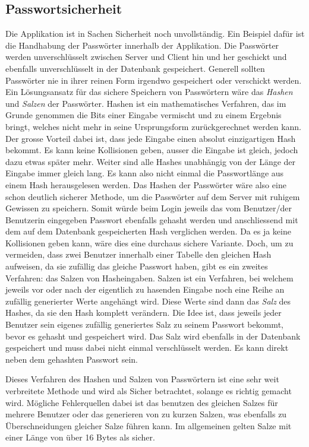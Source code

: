 \documentclass[a4paper,11pt]{report}
\begin{document}
		\subsection{Passwortsicherheit}
		Die Applikation ist in Sachen Sicherheit noch unvollständig. Ein Beispiel dafür ist die Handhabung der Passwörter innerhalb der Applikation. Die Passwörter werden unverschlüsselt zwischen Server und Client hin und her geschickt und ebenfalls unverschlüsselt in der Datenbank gespeichert. Generell sollten Passwörter nie in ihrer reinen Form irgendwo gespeichert oder verschickt werden. Ein Lösungsansatz für das sichere Speichern von Passwörtern wäre das \emph{Hashen} und \emph{Salzen} der Passwörter. Hashen ist ein mathematisches Verfahren, das im Grunde genommen die Bits einer Eingabe vermischt und zu einem Ergebnis bringt, welches nicht mehr in seine Ursprungsform zurückgerechnet werden kann. Der grosse Vorteil dabei ist, dass jede Eingabe einen absolut einzigartigen Hash bekommt. Es kann keine Kollisionen geben, ausser die Eingabe ist gleich, jedoch dazu etwas später mehr. Weiter sind alle Hashes unabhängig von der Länge der Eingabe immer gleich lang. Es kann also nicht einmal die Passwortlänge aus einem Hash herausgelesen werden. Das Hashen der Passwörter wäre also eine schon deutlich sicherer Methode, um die Passwörter auf dem Server mit ruhigem Gewissen zu speichern. Somit würde beim Login jeweils das vom Benutzer/der Benutzerin eingegeben Passwort ebenfalls gehasht werden und anschliessend mit dem auf dem Datenbank gespeicherten Hash verglichen werden. Da es ja keine Kollisionen geben kann, wäre dies eine durchaus sichere Variante. Doch, um zu vermeiden, dass zwei Benutzer innerhalb einer Tabelle den gleichen Hash aufweisen, da sie zufällig das gleiche Passwort haben, gibt es ein zweites Verfahren: das Salzen von Hasheingaben. Salzen ist ein Verfahren, bei welchem jeweils vor oder nach der eigentlich zu hasenden Eingabe noch eine Reihe an zufällig generierter Werte angehängt wird. Diese Werte sind dann das \emph{Salz} des Hashes, da sie den Hash komplett verändern. Die Idee ist, dass jeweils jeder Benutzer sein eigenes zufällig generiertes Salz zu seinem Passwort bekommt, bevor es gehasht und gespeichert wird. Das Salz wird ebenfalls in der Datenbank gespeichert und muss dabei nicht einmal verschlüsselt werden. Es kann direkt neben dem gehashten Passwort sein.
		
		Dieses Verfahren des Hashen und Salzen von Passwörtern ist eine sehr weit verbreitete Methode und wird als Sicher betrachtet, solange es richtig gemacht wird. Mögliche Fehlerquellen dabei ist das benutzen des gleichen Salzes für mehrere Benutzer oder das generieren von zu kurzen Salzen, was ebenfalls zu Überschneidungen gleicher Salze führen kann. Im allgemeinen gelten Salze mit einer Länge von über 16 Bytes als sicher. \cite{defuse} \cite{security}
		
\end{document}
